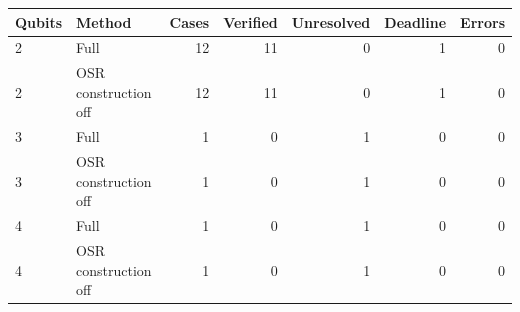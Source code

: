 \begin{center}\small\begin{tabular}{llrrrrr}\toprule
Qubits & Method & Cases & Verified & Unresolved & Deadline & Errors\\\midrule
2 & Full & 12 & 11 & 0 & 1 & 0\\
2 & OSR construction off & 12 & 11 & 0 & 1 & 0\\
3 & Full & 1 & 0 & 1 & 0 & 0\\
3 & OSR construction off & 1 & 0 & 1 & 0 & 0\\
4 & Full & 1 & 0 & 1 & 0 & 0\\
4 & OSR construction off & 1 & 0 & 1 & 0 & 0\\
\bottomrule\end{tabular}\end{center}
